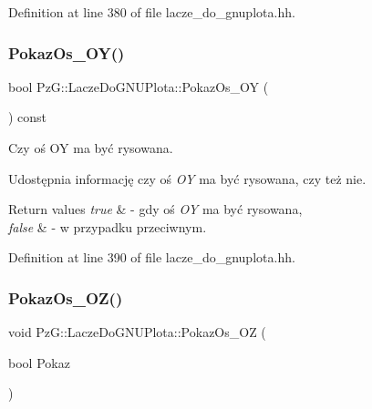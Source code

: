 Definition at line 380 of file lacze\+\_\+do\+\_\+gnuplota.\+hh.

\mbox{\label{class_pz_g_1_1_lacze_do_g_n_u_plota_a7298f469f6932f5c808dcf620650b4b8}} 
\subsubsection{\texorpdfstring{Pokaz\+Os\+\_\+\+O\+Y()}{PokazOs\_OY()}\hspace{0.1cm}{\footnotesize\ttfamily [2/2]}}
{\footnotesize\ttfamily bool Pz\+G\+::\+Lacze\+Do\+G\+N\+U\+Plota\+::\+Pokaz\+Os\+\_\+\+OY (\begin{DoxyParamCaption}{ }\end{DoxyParamCaption}) const\hspace{0.3cm}{\ttfamily [inline]}}



Czy oś OY ma być rysowana. 

Udostępnia informację czy oś {\itshape OY} ma być rysowana, czy też nie. 
\begin{DoxyRetVals}{Return values}
{\em true} & -\/ gdy oś {\itshape OY} ma być rysowana, \\
\hline
{\em false} & -\/ w przypadku przeciwnym. \\
\hline
\end{DoxyRetVals}


Definition at line 390 of file lacze\+\_\+do\+\_\+gnuplota.\+hh.

\mbox{\label{class_pz_g_1_1_lacze_do_g_n_u_plota_a9fabfe88cb1801a5de8923f45f514b99}} 
\subsubsection{\texorpdfstring{Pokaz\+Os\+\_\+\+O\+Z()}{PokazOs\_OZ()}\hspace{0.1cm}{\footnotesize\ttfamily [1/2]}}
{\footnotesize\ttfamily void Pz\+G\+::\+Lacze\+Do\+G\+N\+U\+Plota\+::\+Pokaz\+Os\+\_\+\+OZ (\begin{DoxyParamCaption}\item[{bool}]{Pokaz }\end{DoxyParamCaption})\hspace{0.3cm}{\ttfamily [inline]}}



